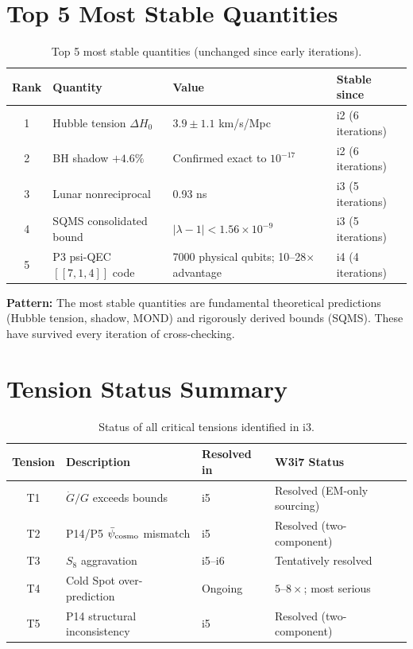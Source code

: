 \documentclass[11pt]{article}
\newcommand{\ee}[1]{\times 10^{#1}}
\newcommand{\lbone}{|\lambda - 1|}
\begin{document}
\section{Top 5 Most Stable Quantities}
\label{sec:stable}

\begin{table}[H]
\centering
\caption{Top 5 most stable quantities (unchanged since early iterations).}
\label{tab:stable}
\begin{tabular}{clll}
\toprule
\textbf{Rank} & \textbf{Quantity} & \textbf{Value} & \textbf{Stable since} \\
\midrule
1 & Hubble tension $\Delta H_0$ &
  $3.9 \pm 1.1$ km/s/Mpc & i2 (6 iterations) \\
2 & BH shadow $+4.6\%$ &
  Confirmed exact to $10^{-17}$ & i2 (6 iterations) \\
3 & Lunar nonreciprocal &
  0.93 ns & i3 (5 iterations) \\
4 & SQMS consolidated bound &
  $\lbone < 1.56\ee{-9}$ & i3 (5 iterations) \\
5 & P3 psi-QEC $[[7,1,4]]$ code &
  7000 physical qubits; 10--28$\times$ advantage &
  i4 (4 iterations) \\
\bottomrule
\end{tabular}
\end{table}

\textbf{Pattern:} The most stable quantities are fundamental theoretical
predictions (Hubble tension, shadow, MOND) and rigorously derived bounds
(SQMS). These have survived every iteration of cross-checking.


\section{Tension Status Summary}
\label{sec:tensions}

\begin{table}[H]
\centering
\caption{Status of all critical tensions identified in i3.}
\label{tab:tensions}
\begin{tabular}{clll}
\toprule
\textbf{Tension} & \textbf{Description} & \textbf{Resolved in} & \textbf{W3i7 Status} \\
\midrule
T1 & $\dot{G}/G$ exceeds bounds & i5 & Resolved (EM-only sourcing) \\
T2 & P14/P5 $\bar{\psi}_{\rm cosmo}$ mismatch & i5 & Resolved (two-component) \\
T3 & $S_8$ aggravation & i5--i6 & Tentatively resolved \\
T4 & Cold Spot over-prediction & Ongoing & $5$--$8\times$; most serious \\
T5 & P14 structural inconsistency & i5 & Resolved (two-component) \\
\bottomrule
\end{tabular}
\end{table}
\end{document}
